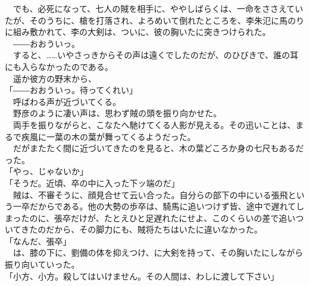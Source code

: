 \documentclass[
  paper=a5,
  fontsize=10pt,
  jafontsize=9.5pt,
  tate,                  %
  open_bracket_pos=nibu, %
]{jlreq}
\begin{document}
　でも、必死になって、七人の賊を相手に、ややしばらくは、一命をささえていたが、そのうちに、槍を打落され、よろめいて倒れたところを、李朱氾に馬のりに組み敷かれて、李の大剣は、ついに、彼の胸いたに突きつけられた。\\


　――おおういっ。\\


　すると、……いやさっきからその声は遠くでしたのだが、のひびきで、誰の耳にも入らなかったのである。\\


　遥か彼方の野末から、\\


「――おおういっ。待ってくれい」\\


　呼ばわる声が近づいてくる。\\


　野彦のように凄い声は、思わず賊の頭を振り向かせた。\\


　両手を振りながらと、こなたへ馳けてくる人影が見える。その迅いことは、まるで疾風に一葉の木の葉が舞ってくるようだった。\\


　だがまたたく間に近づいてきたのを見ると、木の葉どころか身の七尺もあるだった。\\


「やっ、じゃないか」\\


「そうだ。近頃、卒の中に入った下ッ端のだ」\\


　賊は、不審そうに、顔見合せて云い合った。自分らの部下の中にいる張飛という一卒だからである。他の大勢の歩卒は、騎馬に追いつけず皆、途中で遅れてしまったのに、張卒だけが、たとえひと足遅れたにせよ、このくらいの差で追いついてきたのだから、その脚力にも、賊将たちはいたに違いなかった。\\


「なんだ、張卒」\\


　は、膝の下に、劉備の体を抑えつけ、に大剣を持って、その胸いたにしながら振り向いていった。\\


「小方、小方。殺してはいけません。その人間は、わしに渡して下さい」\\
\end{document}
